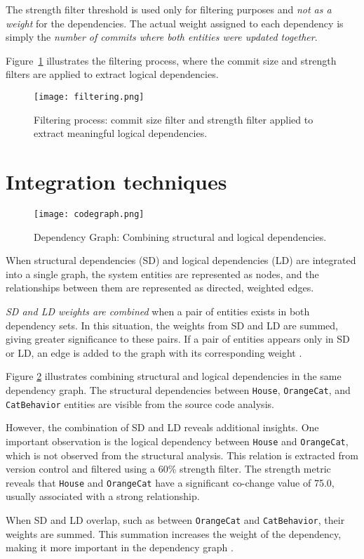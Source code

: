 The strength filter threshold is used only for filtering purposes and \textit{not as a weight} for the dependencies. The actual weight assigned to each dependency is simply the \textit{number of commits where both entities were updated together}.

Figure~\ref{fig:filtering_process} illustrates the filtering process, where the commit size and strength filters are applied to extract logical dependencies.

\begin{figure}[h!]
    \centering
    \texttt{[image: filtering.png]}
    \caption{Filtering process: commit size filter and strength filter applied to extract meaningful logical dependencies.}
    \label{fig:filtering_process}
\end{figure}

\section{Integration techniques}
\label{sec:integration_techniques}



\begin{figure}[t!]
  \centering
  \texttt{[image: codegraph.png]}
  \caption{Dependency Graph: Combining structural and logical dependencies.}
  \label{fig:codegraph}
\end{figure}

When structural dependencies (SD) and logical dependencies (LD) are integrated into a single graph, the system entities are represented as nodes, and the relationships between them are represented as directed, weighted edges. 

\textit{SD and LD weights are combined} when a pair of entities exists in both dependency sets. In this situation, the weights from SD and LD are summed, giving greater significance to these pairs. If a pair of entities appears only in SD or LD, an edge is added to the graph with its corresponding weight \cite{cluster-access}.

Figure \ref{fig:codegraph} illustrates combining structural and logical dependencies in the same dependency graph. The structural dependencies between \texttt{House}, \texttt{OrangeCat}, and \texttt{CatBehavior} entities are visible from the source code analysis.

However, the combination of SD and LD reveals additional insights. One important observation is the logical dependency between \texttt{House} and \texttt{OrangeCat}, which is not observed from the structural analysis. This relation is extracted from version control and filtered using a 60\% strength filter. The strength metric reveals that \texttt{House} and \texttt{OrangeCat} have a significant co-change value of 75.0, usually associated with a strong relationship.

When SD and LD overlap, such as between \texttt{OrangeCat} and \texttt{CatBehavior}, their weights are summed. This summation increases the weight of the dependency, making it more important in the dependency graph \cite{cluster-access}.


